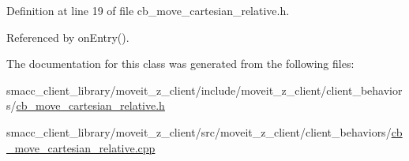 Definition at line 19 of file cb\+\_\+move\+\_\+cartesian\+\_\+relative.\+h.



Referenced by on\+Entry().



The documentation for this class was generated from the following files\+:\begin{DoxyCompactItemize}
\item 
smacc\+\_\+client\+\_\+library/moveit\+\_\+z\+\_\+client/include/moveit\+\_\+z\+\_\+client/client\+\_\+behaviors/\hyperlink{cb__move__cartesian__relative_8h}{cb\+\_\+move\+\_\+cartesian\+\_\+relative.\+h}\item 
smacc\+\_\+client\+\_\+library/moveit\+\_\+z\+\_\+client/src/moveit\+\_\+z\+\_\+client/client\+\_\+behaviors/\hyperlink{cb__move__cartesian__relative_8cpp}{cb\+\_\+move\+\_\+cartesian\+\_\+relative.\+cpp}\end{DoxyCompactItemize}
